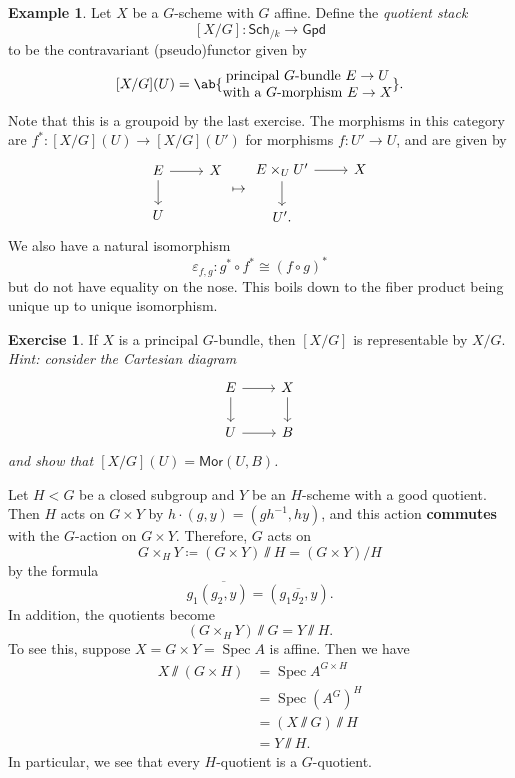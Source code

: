 \documentclass{amsart}
\theoremstyle{definition}
\newtheorem{exm}[thm]{Example}
\newtheorem{exer}[thm]{Exercise}
\theoremstyle{remark}
\theoremstyle{plain}
\theoremstyle{definition}
\theoremstyle{remark}
\newcommand{\ep}{\varepsilon}
\newcommand{\ms}[1]{\mathsf{#1}}
\newcommand{\ol}[1]{\overline{#1}}
\newcommand{\1}{\mathbf{1}}
\newcommand{\2}{\mathbf{2}}
\newcommand{\3}{\mathbf{3}}
\DeclareMathOperator{\Spec}{Spec}
\begin{document}
\begin{exm}
    Let \(X\) be a \(G\)-scheme with \(G\) affine. Define the \textit{quotient stack}
    \[ [X/G] \colon \ms{Sch}_{/k} \to \ms{Gpd} \]
    to be the contravariant (pseudo)functor given by
    \[ [X/G](U) = \ab\{ \Centerstack{{principal \(G\)-bundle \(E \to U\)} {with a \(G\)-morphism \(E \to X\)}} \}. \]
    Note that this is a groupoid by the last exercise. The morphisms in this category are \(f^* \colon [X/G](U) \to [X/G](U')\) for morphisms \(f \colon U' \to U\), and are given by
    \begin{equation*}
    \begin{tikzcd}
        E \ar{r} \ar{d} & X \\
        U
    \end{tikzcd} \mapsto \begin{tikzcd}
        E \times_U U' \ar{r} \ar{d} & X \\
        U'.
    \end{tikzcd}
    \end{equation*}
    We also have a natural isomorphism
    \[ \ep_{f, g} \colon g^* \circ f^* \cong (f \circ g)^* \]
    but do not have equality on the nose. This boils down to the fiber product being unique up to unique isomorphism.
\end{exm}

\begin{exer}
    If \(X\) is a principal \(G\)-bundle, then \([X/G]\) is representable by \(X/G\). \textit{Hint: consider the Cartesian diagram}
    \begin{equation*}
    \begin{tikzcd}
        E \ar{r} \ar{d} & X \ar{d} \\
        U \ar{r} & B
    \end{tikzcd}
    \end{equation*}
    \textit{and show that \([X/G](U) = \ms{Mor}(U, B)\).}
\end{exer}



Let \(H < G\) be a closed subgroup and \(Y\) be an \(H\)-scheme with a good quotient. Then \(H\) acts on \(G \times Y\) by \(h \cdot (g, y) = (gh^{-1}, hy)\), and this action \textbf{commutes} with the \(G\)-action on \(G \times Y\). Therefore, \(G\) acts on
\[ G \times_H Y \coloneqq (G \times Y) \sslash H = (G \times Y) / H \]
by the formula
\[ g_1 \ol{(g_2, y)} = (\ol{g_1 g_2, y}). \]
In addition, the quotients become
\[ (G \times_H Y) \sslash G = Y \sslash H. \]
To see this, suppose \(X = G \times Y = \Spec A\) is affine. Then we have
\begin{align*}
    X \sslash (G \times H) &= \Spec A^{G \times H} \\
    &= \Spec (A^G)^H \\
    &= (X \sslash G) \sslash H \\
    &= Y \sslash H.
\end{align*}
In particular, we see that every \(H\)-quotient is a \(G\)-quotient.
\end{document}
